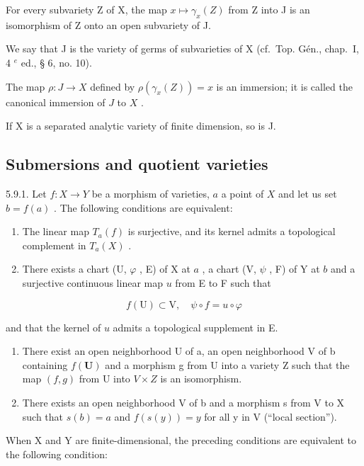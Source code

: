 For every subvariety Z of X, the map \(x \mapsto \gamma_{x}(Z)\) from Z into J is an isomorphism of Z onto an open subvariety of J.

We say that J is the variety of germs of subvarieties of X (cf.~Top. Gén., chap.~I, 4 \(^{e}\) ed., § 6, no. 10).

The map \(\rho: J \to X\) defined by \(\rho(\gamma_x(Z)) = x\) is an immersion; it is called the canonical immersion of \(J\) to \(X\) .

If X is a separated analytic variety of finite dimension, so is J.

\subsection{Submersions and quotient varieties}

5.9.1. Let \(f: X \to Y\) be a morphism of varieties, \(a\) a point of \(X\) and let us set \(b = f(a)\) . The following conditions are equivalent:

\begin{enumerate}
\def\labelenumi{(\roman{enumi})}
\item
  The linear map \(T_{a}(f)\) is surjective, and its kernel admits a topological complement in \(T_{a}(X)\) .
\item
  There exists a chart (U, \(\varphi\) , E) of X at \(a\) , a chart (V, \(\psi\) , F) of Y at \(b\) and a surjective continuous linear map \(u\) from E to F such that
\end{enumerate}

\[
f (\mathrm{U}) \subset \mathrm{V}, \quad \psi \circ f = u \circ \varphi
\]

and that the kernel of \(u\) admits a topological supplement in E.

\begin{enumerate}
\def\labelenumi{(\roman{enumi})}
\setcounter{enumi}{2}
\item
  There exist an open neighborhood U of a, an open neighborhood V of b containing \(f(\mathbf{U})\) and a morphism g from U into a variety Z such that the map \((f,g)\) from U into \(V \times Z\) is an isomorphism.
\item
  There exists an open neighborhood V of b and a morphism s from V to X such that \(s(b) = a\) and \(f(s(y)) = y\) for all y in V (“local section”).
\end{enumerate}

When X and Y are finite-dimensional, the preceding conditions are equivalent to the following condition:

